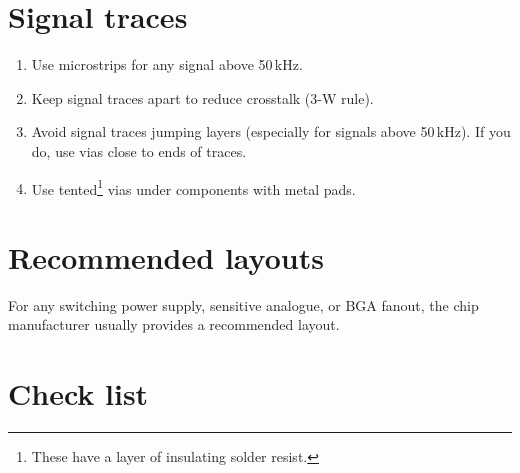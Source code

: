 \section{Signal traces}

\begin{enumerate}

\item
  Use microstrips for any signal above 50\,kHz.

\item
  Keep signal traces apart to reduce crosstalk (3-W rule).

\item
  Avoid signal traces jumping layers (especially for signals above
  50\,kHz).  If you do, use vias close to ends of traces.

\item
  Use tented\footnote{These have a layer of insulating solder resist.}
  vias under components with metal pads.

\end{enumerate}


\section{Recommended layouts}

For any switching power supply, sensitive analogue, or BGA fanout, the
chip manufacturer usually provides a recommended layout.

\section{Check list}
\label{PCB-check-list}

